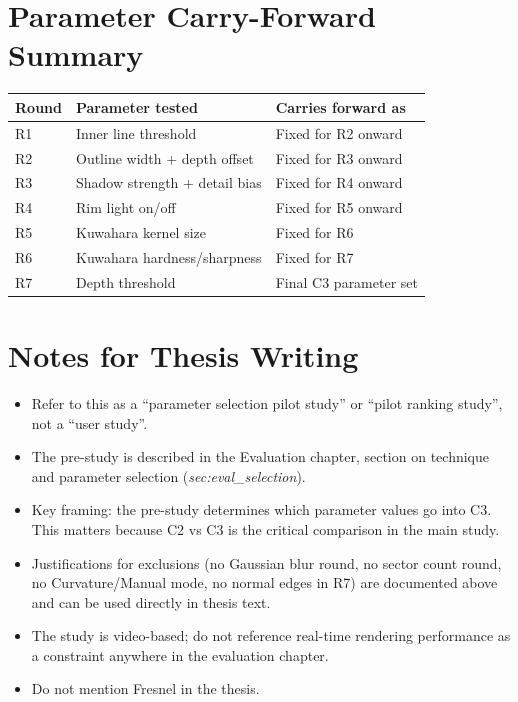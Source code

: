 \documentclass[11pt,a4paper]{article}
\begin{document}
\bigskip

\section*{Parameter Carry-Forward Summary}

\begin{tabular}{lll}
\toprule
\textbf{Round} & \textbf{Parameter tested} & \textbf{Carries forward as} \\
\midrule
R1 & Inner line threshold & Fixed for R2 onward \\
R2 & Outline width + depth offset & Fixed for R3 onward \\
R3 & Shadow strength + detail bias & Fixed for R4 onward \\
R4 & Rim light on/off & Fixed for R5 onward \\
R5 & Kuwahara kernel size & Fixed for R6 \\
R6 & Kuwahara hardness/sharpness & Fixed for R7 \\
R7 & Depth threshold & Final C3 parameter set \\
\bottomrule
\end{tabular}

\bigskip

\section*{Notes for Thesis Writing}

\begin{itemize}[nosep,leftmargin=1.2em]
  \item Refer to this as a ``parameter selection pilot study'' or ``pilot ranking study'', not a ``user study''.
  \item The pre-study is described in the Evaluation chapter, section on technique and parameter selection (\textit{sec:eval\_selection}).
  \item Key framing: the pre-study determines which parameter values go into C3. This matters because C2 vs C3 is the critical comparison in the main study.
  \item Justifications for exclusions (no Gaussian blur round, no sector count round, no Curvature/Manual mode, no normal edges in R7) are documented above and can be used directly in thesis text.
  \item The study is video-based; do not reference real-time rendering performance as a constraint anywhere in the evaluation chapter.
  \item Do not mention Fresnel in the thesis.
\end{itemize}
\end{document}
